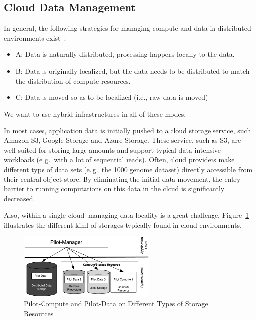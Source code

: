 \documentclass[times]{cpeauth}
\begin{document}
\subsection{Cloud Data Management}

In general, the following strategies for managing compute and
data in distributed environments exist~\cite{jha-katz-2013}:
\begin{itemize}
\item A: Data is naturally distributed, processing happens locally to
  the data.
\item B: Data is originally localized, but the data needs to be distributed to match the distribution of compute resources.
\item C: Data is moved so as to be localized (i.e., raw data is moved)
\end{itemize}
We want to use hybrid infrastructures in all of these modes.

In most cases, application data is initially pushed to a cloud storage
service, such Amazon S3, Google Storage and Azure Storage. These service, such
as S3, are well suited for storing large amounts and support typical
data-intensive workloads (e.\,g.\ with a lot of sequential reads). Often,
cloud providers make different type of data sets (e.\,g.\ the 1000 genome
dataset) directly accessible from their central object store. By eliminating
the initial data movement, the entry barrier to running computations on this
data in the cloud is significantly decreased.

Also, within a single cloud, managing data locality is a great challenge. 
Figure~\ref{fig:figures_storage-types} illustrates the different kind of 
storages typically found in cloud environments. 

\begin{figure}[t]
	\centering
		\includegraphics[width=0.6\textwidth]{figures/storage-types.pdf}
                \caption{Pilot-Compute and Pilot-Data on Different
                  Types of Storage Resources}
	\label{fig:figures_storage-types}
      \end{figure}
\end{document}
